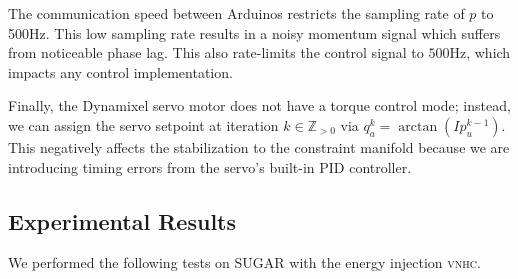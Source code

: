 \documentclass[journal,twoside,web, twocolumn]{ieeecolor}
\newcommand*{\vnhc}{\textsc{vnhc}\xspace}
\begin{document}
The communication speed between Arduinos restricts the sampling rate of \(p\) to
500Hz.
This low sampling rate results in a noisy momentum signal which suffers
from noticeable phase lag.
This also rate-limits the control signal to \(500\)Hz, which impacts any control
implementation.

Finally, the Dynamixel servo motor does not have a torque control mode; instead,
we can assign the servo setpoint at iteration \(k \in \mathbb{Z}_{> 0}\)
via \(q_a^{k} = \arctan(I p_u^{k-1})\).
This negatively affects the stabilization to the constraint
manifold because we are introducing timing errors from the servo's built-in PID
controller.

\subsection{Experimental Results}

We performed the following tests on SUGAR with the energy injection \vnhc.
\end{document}
